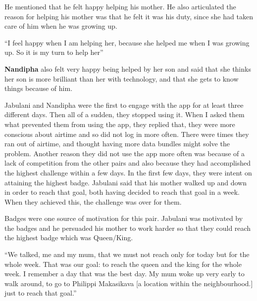 He mentioned that he felt happy helping his mother. He also articulated the reason for helping his mother was that he felt it was his duty, since she had taken care of him when he was growing up. 

 {``I feel happy when I am helping her, because she helped me when I was growing up. So it is my turn to help her''}

\textbf{Nandipha} also felt very happy being helped by her son and said that she thinks her son is more brilliant than her with technology, and that she gets to know things because of him. 

Jabulani and Nandipha were the first to engage with the app for at least three different days. Then all of a sudden, they stopped using it. When I asked them what prevented them from using the app, they replied that, they were more conscious about airtime and so did not log in more often. There were times they ran out of airtime, and thought having more data bundles might solve the problem. Another reason they did not use the app more often was because of a lack of competition from the other pairs and also because they had accomplished the highest challenge within a few days. In the first few days, they were intent on attaining the highest badge. Jabulani said that his mother walked up and down in  order to reach that goal, both having decided to reach that goal in  a week. When they achieved this, the challenge was over for them.

Badges were one source of motivation for this pair. Jabulani was motivated by the badges and he persuaded his mother to work harder so that they could reach the highest badge which was Queen/King.

 {``We talked, me and my mum, that we must not reach only for today but for the whole week. That was our goal: to reach the queen and the king for the whole week. I remember a day that was the best day. My mum woke up very early to walk around, to go to Philippi Makasikava [a location within the neighbourhood.] just to reach that goal.''}

